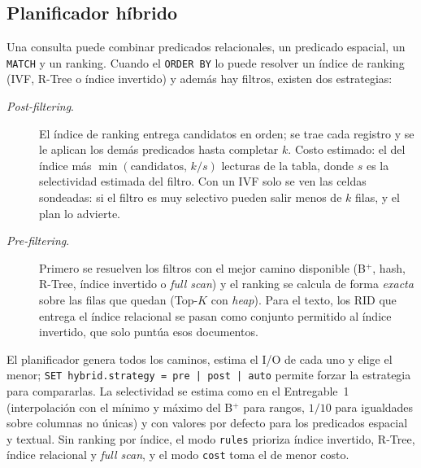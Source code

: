 \documentclass[11pt,a4paper]{article}
\newcommand{\code}[1]{\texttt{#1}}
\begin{document}
\subsection{Planificador híbrido}

Una consulta puede combinar predicados relacionales, un predicado espacial, un \code{MATCH} y un
ranking. Cuando el \code{ORDER BY} lo puede resolver un índice de ranking (IVF, R-Tree o índice
invertido) y además hay filtros, existen dos estrategias:

\begin{description}
\item[\emph{Post-filtering}.] El índice de ranking entrega candidatos en orden; se trae cada registro
  y se le aplican los demás predicados hasta completar $k$. Costo estimado: el del índice más
  $\min(\text{candidatos},\, k/s)$ lecturas de la tabla, donde $s$ es la selectividad estimada del
  filtro. Con un IVF solo se ven las celdas sondeadas: si el filtro es muy selectivo pueden salir
  menos de $k$ filas, y el plan lo advierte.
\item[\emph{Pre-filtering}.] Primero se resuelven los filtros con el mejor camino disponible (B$^+$,
  hash, R-Tree, índice invertido o \emph{full scan}) y el ranking se calcula de forma \emph{exacta}
  sobre las filas que quedan (Top-$K$ con \emph{heap}). Para el texto, los RID que entrega el índice
  relacional se pasan como conjunto permitido al índice invertido, que solo puntúa esos documentos.
\end{description}

El planificador genera todos los caminos, estima el I/O de cada uno y elige el menor; \code{SET
hybrid.strategy = pre | post | auto} permite forzar la estrategia para compararlas. La selectividad
se estima como en el Entregable~1 (interpolación con el mínimo y máximo del B$^+$ para rangos,
$1/10$ para igualdades sobre columnas no únicas) y con valores por defecto para los predicados
espacial y textual. Sin ranking por índice, el modo \code{rules} prioriza índice invertido, R-Tree,
índice relacional y \emph{full scan}, y el modo \code{cost} toma el de menor costo.

\begin{table}[H]
\centering\small
\resizebox{\ifdim\width>\textwidth\textwidth\else\width\fi}{!}{}
\caption{La misma consulta híbrida sobre \code{productos} con las dos estrategias (medido). Con el
filtro amplio el planificador elige \emph{post-filtering}; con el selectivo, \emph{pre-filtering},
porque el \emph{post-filtering} tendría que revisar casi todos los candidatos y aun así no completa
$k$.}
\label{tab:hibrido}
\end{table}
\end{document}
